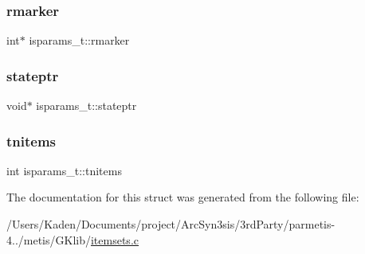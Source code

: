\mbox{\label{a00698_ae83e2391121d3113b67ddd02c868eb6c}} 
\subsubsection{\texorpdfstring{rmarker}{rmarker}}
{\footnotesize\ttfamily int$\ast$ isparams\+\_\+t\+::rmarker}

\mbox{\label{a00698_a11588df8c18be6e4a5721d68d917b2a7}} 
\subsubsection{\texorpdfstring{stateptr}{stateptr}}
{\footnotesize\ttfamily void$\ast$ isparams\+\_\+t\+::stateptr}

\mbox{\label{a00698_aa8d4c3fc130ae48f825e6787f91817df}} 
\subsubsection{\texorpdfstring{tnitems}{tnitems}}
{\footnotesize\ttfamily int isparams\+\_\+t\+::tnitems}



The documentation for this struct was generated from the following file\+:\begin{DoxyCompactItemize}
\item 
/\+Users/\+Kaden/\+Documents/project/\+Arc\+Syn3sis/3rd\+Party/parmetis-\/4../metis/\+G\+Klib/\hyperlink{a00104}{itemsets.\+c}\end{DoxyCompactItemize}
